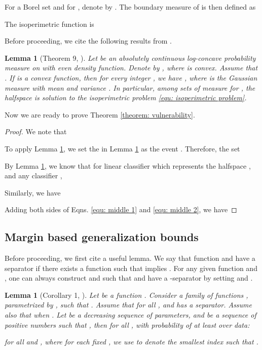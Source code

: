\documentclass[11pt]{article}
\newtheorem{lemma}[theorem]{Lemma}
\newcommand{\0}{\mathbf{0}}
\newcommand{\1}{\mathbf{1}}
\begin{document}
For a Borel set  and for , denote by . The boundary measure of  is then defined as

The isoperimetric function is


Before proceeding, we cite the following results from \cite{barthe2001extremal}.
\begin{lemma}[Theorem 9, \cite{barthe2001extremal}]
\label{lemma: isoperimetry}
Let  be an absolutely continuous log-concave probability measure on  with even density function. Denote by , where  is convex. Assume that . If  is a convex function, then for every integer , we have , where  is the Gaussian measure with mean  and variance . In particular, among sets of measure  for , the halfspace  is solution to the isoperimetric problem \eqref{equ: isoperimetric problem}.
\end{lemma}

Now we are ready to prove Theorem \ref{theorem: vulnerability}.


\begin{proof}
We note that

To apply Lemma \ref{lemma: isoperimetry}, we set the  in Lemma \ref{lemma: isoperimetry} as the event . Therefore, the set

By Lemma \ref{lemma: isoperimetry}, we know that for linear classifier  which represents the halfspace , and any classifier ,

Similarly, we have

Adding both sides of Eqns. \eqref{equ: middle 1} and \eqref{equ: middle 2}, we have

\end{proof}



\subsection{Margin based generalization bounds}

Before proceeding, we first cite a useful lemma. We say that function  and  have a  separator if there exists a function  such that  implies . For any given function  and , one can always construct  and  such that  and  have a -separator  by setting  and .

\begin{lemma}[Corollary 1, \cite{zhang2002covering}]
\label{lemma: general margin bound}
Let  be a function . Consider a family of functions , parametrized by , such that . Assume that for all ,  and  has a  separator. Assume also that  when . Let  be a decreasing sequence of parameters, and  be a sequence of positive numbers such that , then for all , with probability of at least  over data:

for all  and , where for each fixed , we use  to denote the smallest index such that .
\end{lemma}
\end{document}
